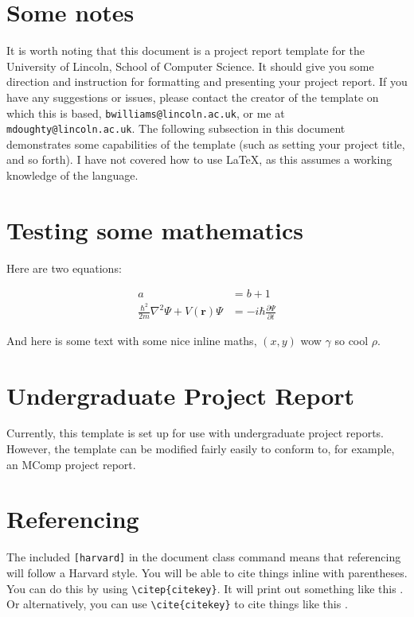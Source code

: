 \section{Some notes}
It is worth noting that this document is a project report template for the University of Lincoln, School of Computer Science. It should give you some direction and instruction for formatting and presenting your project report. If you have any suggestions or issues, please contact the creator of the template on which this is based, \texttt{bwilliams@lincoln.ac.uk}, or me at \texttt{mdoughty@lincoln.ac.uk}. The following subsection in this document demonstrates some capabilities of the template (such as setting your project title, and so forth). I have not covered how to use \LaTeX, as this assumes a working knowledge of the language.




\section{Testing some mathematics}
Here are two equations:

\begin{align}
a &= b + 1 \\
\frac{\hbar^2}{2m}\nabla^2\Psi + V(\mathbf{r})\Psi
&= -i\hbar \frac{\partial\Psi}{\partial t}    
\end{align}


And here is some text with some nice inline maths, $(x, y)$ wow $\gamma$ so cool $\rho$.


\section{Undergraduate Project Report}
Currently, this template is set up for use with undergraduate project reports. However, the template can be modified fairly easily to conform to, for example, an MComp project report.
\section{Referencing}
The included \texttt{[harvard]} in the document class command means that referencing will follow a Harvard style. You will be able to cite things inline with parentheses. You can do this by using \texttt{\textbackslash citep\{citekey\}}. It will print out something like this \citep{aad2012observation}. Or alternatively, you can use \texttt{\textbackslash cite\{citekey\}} to cite things like this \cite{chatrchyan2012observation}.

